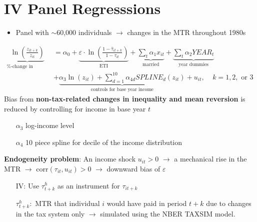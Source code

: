 \documentclass[8pt]{beamer}
\begin{document}
\section{IV Panel Regresssions}


\begin{frame}{\citet{gruber2002elasticity}}
  \begin{itemize}
    \item Panel with $\sim$60,000 individuals $\rightarrow$ changes in the MTR throughout 1980s
  \end{itemize}
  \begin{equation}
    \begin{split}
      \underbrace{\ln\left(\frac{z_{it+k}}{z_{it}}\right)}_\text{\%-change in income} &= \alpha_0 + \underbrace{\varepsilon\cdot \ln\left(\frac{1-\hat{\tau}_{it+k}}{1-\tau_{it}}\right)}_\text{ETI} + \underbrace{\sum_t\alpha_1 x_{it}}_\text{married} + \underbrace{\sum_t \alpha_2YEAR_t}_\text{year dummies} \\
       &+\underbrace{ \alpha_3\ln(z_{it}) + \sum_{d=1}^{10}\alpha_{4d}SPLINE_d(z_{it}) }_\text{controls for base year income} + u_{it},\ \ \ \ \ k=1,2,\text{ or }3
      \label{eq:IV}
    \end{split}
  \end{equation}
  Bias from \textbf{non-tax-related changes in inequality and mean reversion } is reduced by controlling for income in base year $t$
  \begin{itemize}
    \item[$\alpha_3$] log-income level
    \item[$\alpha_4$] 10 piece spline for decile of the income distribution
  \end{itemize}
  \textbf{Endogeneity problem}: An income shock $u_{it}>0$ $\rightarrow$ a mechanical rise in the MTR $\rightarrow$ corr$(\tau_{it},u_{it})>0$ $\rightarrow$ downward bias of $\varepsilon$
  \begin{itemize}
    \item[IV:] Use $\tau^h_{t+k}$ as an instrument for $\tau_{it+k}$
    \item[$\tau^h_{t+k}:$] MTR that individual $i$ would have paid in period $t+k$ due to changes in the tax system only $\rightarrow$ simulated using the NBER TAXSIM model.
  \end{itemize}
\end{frame}
\end{document}
